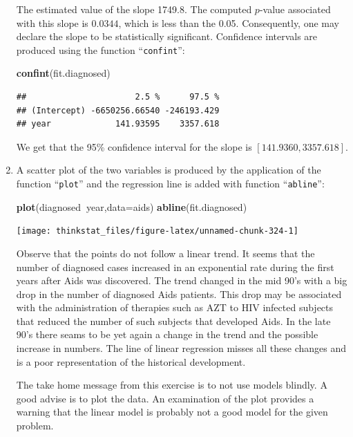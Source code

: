 \documentclass[]{krantz}
\makeatletter
\newenvironment{Shaded}{\begin{snugshade}}{\end{snugshade}}
\newcommand{\KeywordTok}[1]{\textcolor[rgb]{0.13,0.29,0.53}{\textbf{#1}}}
\newcommand{\DataTypeTok}[1]{\textcolor[rgb]{0.13,0.29,0.53}{#1}}
\newcommand{\OperatorTok}[1]{\textcolor[rgb]{0.81,0.36,0.00}{\textbf{#1}}}
\newcommand{\NormalTok}[1]{#1}
\newenvironment{kframe}{%
\medskip{}
\setlength{\fboxsep}{.8em}
 \def\at@end@of@kframe{}%
 \ifinner\ifhmode%
  \def\at@end@of@kframe{\end{minipage}}%
  \begin{minipage}{\columnwidth}%
 \fi\fi%
 \def\FrameCommand##1{\hskip\@totalleftmargin \hskip-\fboxsep
 \colorbox{shadecolor}{##1}\hskip-\fboxsep
     \hskip-\linewidth \hskip-\@totalleftmargin \hskip\columnwidth}%
 \MakeFramed {\advance\hsize-\width
   \@totalleftmargin\z@ \linewidth\hsize
   \@setminipage}}%
 {\par\unskip\endMakeFramed%
 \at@end@of@kframe}
\renewenvironment{Shaded}{\begin{kframe}}{\end{kframe}}
\theoremstyle{definition}
\theoremstyle{definition}
\theoremstyle{definition}
\theoremstyle{remark}
\makeatother
\begin{document}
\begin{enumerate}
  The estimated value of the slope 1749.8. The computed \(p\)-value
  associated with this slope is \(0.0344\), which is less than the 0.05.
  Consequently, one may declare the slope to be statistically
  significant. Confidence intervals are produced using the function
  ``\texttt{confint}'':

\begin{Shaded}
\begin{Highlighting}[]
\KeywordTok{confint}\NormalTok{(fit.diagnosed)}
\end{Highlighting}
\end{Shaded}

\begin{verbatim}
##                      2.5 %      97.5 %
## (Intercept) -6650256.66540 -246193.429
## year             141.93595    3357.618
\end{verbatim}

  We get that the 95\% confidence interval for the slope is
  \([141.9360, 3357.618]\).
\item
  A scatter plot of the two variables is produced by the application of
  the function ``\texttt{plot}'' and the regression line is added with
  function ``\texttt{abline}'':

\begin{Shaded}
\begin{Highlighting}[]
\KeywordTok{plot}\NormalTok{(diagnosed}\OperatorTok{~}\NormalTok{year,}\DataTypeTok{data=}\NormalTok{aids)}
\KeywordTok{abline}\NormalTok{(fit.diagnosed)}
\end{Highlighting}
\end{Shaded}

  \begin{center}\texttt{[image: thinkstat\_files/figure-latex/unnamed-chunk-324-1]} \end{center}

  Observe that the points do not follow a linear trend. It seems that
  the number of diagnosed cases increased in an exponential rate during
  the first years after Aids was discovered. The trend changed in the
  mid 90's with a big drop in the number of diagnosed Aids patients.
  This drop may be associated with the administration of therapies such
  as AZT to HIV infected subjects that reduced the number of such
  subjects that developed Aids. In the late 90's there seams to be yet
  again a change in the trend and the possible increase in numbers. The
  line of linear regression misses all these changes and is a poor
  representation of the historical development.

  The take home message from this exercise is to not use models blindly.
  A good advise is to plot the data. An examination of the plot provides
  a warning that the linear model is probably not a good model for the
  given problem.
\end{enumerate}
\end{document}
